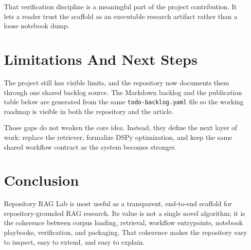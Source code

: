\documentclass[11pt]{article}
\begin{document}
That verification discipline is a meaningful part of the project contribution. It lets a reader
trust the scaffold as an executable research artifact rather than a loose notebook dump.

\section{Limitations And Next Steps}

The project still has visible limits, and the repository now documents them through one shared
backlog source. The Markdown backlog and the publication table below are generated from the same
\texttt{todo-backlog.yaml} file so the working roadmap is visible in both the repository and the
article.



Those gaps do not weaken the core idea. Instead, they define the next layer of work: replace the
retriever, formalize DSPy optimization, and keep the same shared workflow contract as the system
becomes stronger.

\section{Conclusion}

Repository RAG Lab is most useful as a transparent, end-to-end scaffold for repository-grounded
RAG research. Its value is not a single novel algorithm; it is the coherence between corpus
loading, retrieval, workflow entrypoints, notebook playbooks, verification, and packaging. That
coherence makes the repository easy to inspect, easy to extend, and easy to explain.



\end{document}
